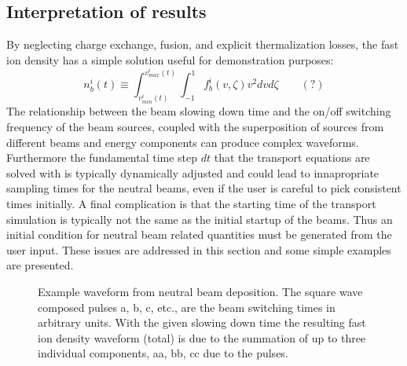 \subsection{Interpretation of results}
By neglecting charge exchange, fusion, and explicit thermalization  losses, the
fast ion  density has a simple solution useful for demonstration purposes:
\begin{equation}
 n_b^i(t) \equiv \int_{v_{min}^i(t)}^{v_{max}^i(t)}
 \int_{-1}^{1} 
 f_b^i(v,\zeta)
 v^2dvd\zeta   
 \label{eq:wav5} \qquad (?)
\end{equation}
The relationship between the beam slowing down time and the on/off switching
frequency of the beam sources, coupled with the superposition of sources from
different beams and energy components can produce complex waveforms. Furthermore
the fundamental time step $ dt $ that  the transport equations are solved with
is typically dynamically adjusted and could lead to innapropriate sampling times
for the neutral beams, even if the user is careful to pick consistent times
initially.  A final complication is that the starting time of the transport
simulation is typically not the same as the initial startup of the beams. Thus
an initial condition for neutral beam related quantities must be generated from
the user input. These issues are addressed in this section and some simple
examples are presented.
\begin{figure}[hbt] %
 \centering
 \mbox{}
 \caption{Example waveform from neutral beam deposition. The square wave
 composed pulses a, b, c, etc., are the beam switching times in arbitrary units.
 With the given slowing down time  the resulting fast ion density waveform
 (total) is  due to the summation of up to three individual components, aa, bb,
 cc due to the pulses.}
 \label{Figbwav1}
\end{figure}

